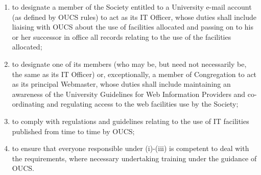 \documentclass[11pt]{article}
\begin{document}
\begin{enumerate}
\begin{enumerate}
\item to designate a member of the Society entitled to a University e-mail account (as defined by OUCS rules) to act as its IT Officer, whose duties shall include liaising with OUCS about the use of facilities allocated and passing on to his or her successor in office all records relating to the use of the facilities allocated;
\item to designate one of its members (who may be, but need not necessarily be, the same as its IT Officer) or, exceptionally, a member of Congregation to act as its principal Webmaster, whose duties shall include maintaining an awareness of the University Guidelines for Web Information Providers and co-ordinating and regulating access to the web facilities use by the Society;
\item to comply with regulations and guidelines relating to the use of IT facilities published from time to time by OUCS;
\item to ensure that everyone responsible under (i)-(iii) is competent to deal with the requirements, where necessary undertaking training under the guidance of OUCS.
\end{enumerate}
\end{enumerate}
\end{document}
